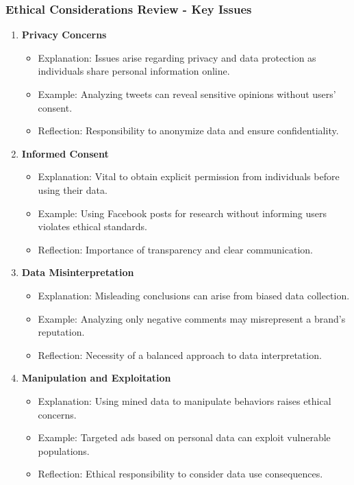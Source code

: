 \documentclass{beamer}
\begin{document}
\begin{frame}[fragile]
    \frametitle{Ethical Considerations Review - Key Issues}
    \begin{enumerate}
        \item \textbf{Privacy Concerns}
            \begin{itemize}
                \item Explanation: Issues arise regarding privacy and data protection as individuals share personal information online.
                \item Example: Analyzing tweets can reveal sensitive opinions without users' consent.
                \item Reflection: Responsibility to anonymize data and ensure confidentiality.
            \end{itemize}
        
        \item \textbf{Informed Consent}
            \begin{itemize}
                \item Explanation: Vital to obtain explicit permission from individuals before using their data.
                \item Example: Using Facebook posts for research without informing users violates ethical standards.
                \item Reflection: Importance of transparency and clear communication.
            \end{itemize}
        
        \item \textbf{Data Misinterpretation}
            \begin{itemize}
                \item Explanation: Misleading conclusions can arise from biased data collection.
                \item Example: Analyzing only negative comments may misrepresent a brand’s reputation.
                \item Reflection: Necessity of a balanced approach to data interpretation.
            \end{itemize}
        
        \item \textbf{Manipulation and Exploitation}
            \begin{itemize}
                \item Explanation: Using mined data to manipulate behaviors raises ethical concerns.
                \item Example: Targeted ads based on personal data can exploit vulnerable populations.
                \item Reflection: Ethical responsibility to consider data use consequences.
            \end{itemize}
    \end{enumerate}
\end{frame}
\end{document}
